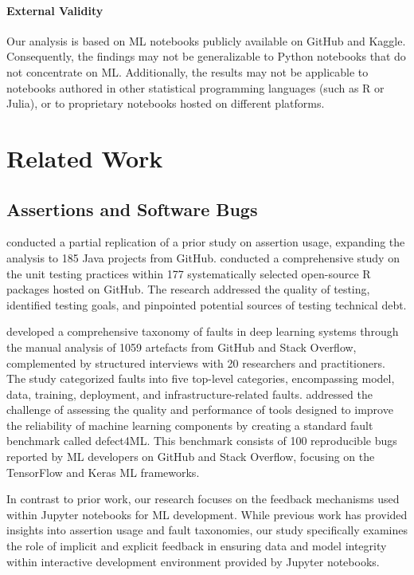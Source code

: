 \documentclass[smallextended]{svjour3}       %
\begin{document}
\paragraph{\textbf{External Validity}} Our analysis is based on ML notebooks publicly available on GitHub and Kaggle. Consequently, the findings may not be generalizable to Python notebooks that do not concentrate on ML. Additionally, the results may not be applicable to notebooks authored in other statistical programming languages (such as R or Julia), or to proprietary notebooks hosted on different platforms.

\section{Related Work}\label{sec:related}

\subsection{Assertions and Software Bugs}

\citet{kochhar2017revisiting} conducted a partial replication of a prior study on assertion usage, expanding the analysis to 185 Java projects from GitHub. \citet{vidoni2021evaluating} conducted a comprehensive study on the unit testing practices within 177 systematically selected open-source R packages hosted on GitHub. The research addressed the quality of testing, identified testing goals, and pinpointed potential sources of testing technical debt.

\citet{humbatova2020taxonomy} developed a comprehensive taxonomy of faults in deep learning systems through the manual analysis of 1059 artefacts from GitHub and Stack Overflow, complemented by structured interviews with 20 researchers and practitioners. The study categorized faults into five top-level categories, encompassing model, data, training, deployment, and infrastructure-related faults. \citet{morovati2023bugs} addressed the challenge of assessing the quality and performance of tools designed to improve the reliability of machine learning components by creating a standard fault benchmark called defect4ML. This benchmark consists of 100 reproducible bugs reported by ML developers on GitHub and Stack Overflow, focusing on the TensorFlow and Keras ML frameworks.

In contrast to prior work, our research focuses on the feedback mechanisms used within Jupyter notebooks for ML development. While previous work has provided insights into assertion usage and fault taxonomies, our study specifically examines the role of implicit and explicit feedback in ensuring data and model integrity within interactive development environment provided by Jupyter notebooks.
\end{document}
